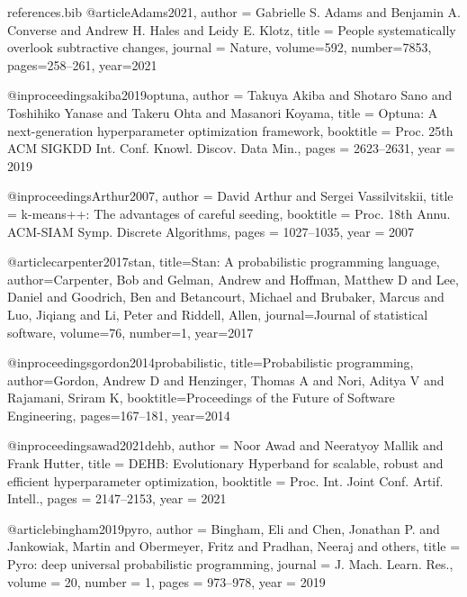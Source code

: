 \documentclass[pdflatex,sn-basic]{sn-jnl}
\begin{document}
\begin{filecontents}{references.bib}
@article{Adams2021,
  author  = {Gabrielle S. Adams and Benjamin A. Converse and Andrew H. Hales and Leidy E. Klotz},
  title   = {People systematically overlook subtractive changes},
  journal = {Nature}, volume={592}, number={7853}, pages={258--261}, year={2021}
}

@inproceedings{akiba2019optuna,
  author    = {Takuya Akiba and Shotaro Sano and Toshihiko Yanase and Takeru Ohta and Masanori Koyama},
  title     = {Optuna: A next-generation hyperparameter optimization framework},
  booktitle = {Proc. 25th ACM SIGKDD Int. Conf. Knowl. Discov. Data Min.},
  pages     = {2623--2631},
  year      = {2019}
}



@inproceedings{Arthur2007,
  author    = {David Arthur and Sergei Vassilvitskii},
  title     = {{k}-means++: The advantages of careful seeding},
  booktitle = {Proc. 18th Annu. ACM-SIAM Symp. Discrete Algorithms},
  pages     = {1027--1035},
  year      = {2007}
}

@article{carpenter2017stan,
  title={Stan: A probabilistic programming language},
  author={Carpenter, Bob and Gelman, Andrew and Hoffman, Matthew D and Lee, Daniel and Goodrich, Ben and Betancourt, Michael and Brubaker, Marcus and Luo, Jiqiang and Li, Peter and Riddell, Allen},
  journal={Journal of statistical software},
  volume={76},
  number={1},
  year={2017}
}

@inproceedings{gordon2014probabilistic,
  title={Probabilistic programming},
  author={Gordon, Andrew D and Henzinger, Thomas A and Nori, Aditya V and Rajamani, Sriram K},
  booktitle={Proceedings of the Future of Software Engineering},
  pages={167--181},
  year={2014}
}

@inproceedings{awad2021dehb,
  author    = {Noor Awad and Neeratyoy Mallik and Frank Hutter},
  title     = {DEHB: Evolutionary Hyperband for scalable, robust and efficient hyperparameter optimization},
  booktitle = {Proc. Int. Joint Conf. Artif. Intell.},
  pages     = {2147--2153},
  year      = {2021}
}


@article{bingham2019pyro,
  author = {Bingham, Eli and Chen, Jonathan P. and Jankowiak, Martin and Obermeyer, Fritz and Pradhan, Neeraj and others},
  title = {Pyro: deep universal probabilistic programming},
  journal = {J. Mach. Learn. Res.},
  volume = {20},
  number = {1},
  pages = {973--978},
  year = {2019}
}


\end{filecontents}
\end{document}

